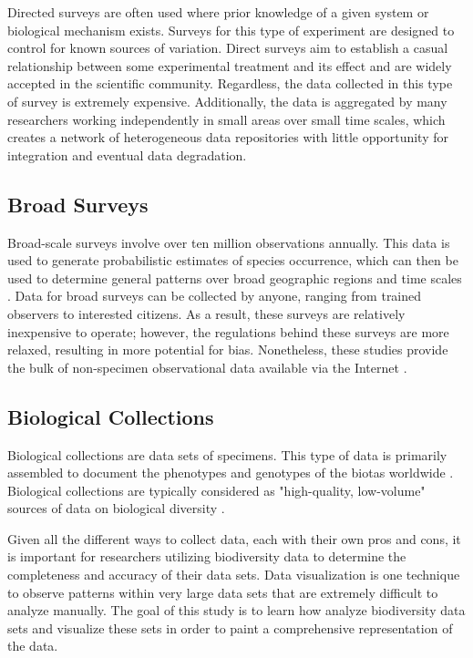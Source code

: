 Directed surveys are often used where prior knowledge of a given system or biological mechanism exists.
Surveys for this type of experiment are designed to control for known sources of variation\cite {GBIFbirds}.
Direct surveys aim to establish a casual relationship between some experimental treatment and its effect and are widely accepted in the scientific community.
Regardless, the data collected in this type of survey is extremely expensive.
Additionally, the data is aggregated by many researchers working independently in small areas over small time scales, which creates a network of heterogeneous data repositories with little opportunity for integration and eventual data degradation.

\subsection{Broad  Surveys}

Broad-scale surveys involve over ten million observations annually.
This data is used to generate probabilistic estimates of species occurrence, which can then be used to determine general patterns over broad geographic regions and time scales \cite {GBIFbirds}.
Data for broad surveys can be collected by anyone, ranging from trained observers to interested citizens.
As a result, these surveys are relatively inexpensive to operate; however, the regulations behind these surveys are more relaxed, resulting in more potential for bias.
Nonetheless, these studies provide the bulk of non-specimen observational data available via the Internet \cite {SP}.

\subsection{Biological Collections}

Biological collections are data sets of specimens.
This type of data is primarily assembled to document the phenotypes and genotypes of the biotas worldwide \cite{Barve}.
Biological collections are typically considered as "high-quality, low-volume" sources of data on biological diversity \cite{Barve}.

Given all the different ways to collect data, each with their own pros and cons, it is important for researchers utilizing biodiversity data to determine the completeness and accuracy of their data sets.
Data visualization is one technique to observe patterns within very large data sets that are extremely difficult to analyze manually.
The goal of this study is to learn how analyze biodiversity data sets and visualize these sets in order to paint a comprehensive representation of the data.

